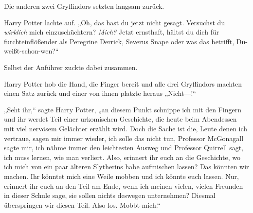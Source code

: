 Die anderen zwei Gryffindors setzten langsam zurück.

Harry Potter lachte auf. „Oh, das hast du jetzt nicht gesagt. Versuchst du \emph{wirklich} mich einzuschüchtern? \emph{Mich?} Jetzt ernsthaft, hältst du dich für furchteinflößender als Peregrine Derrick, Severus Snape oder was das betrifft, Du-weißt-schon-wen?“

Selbst der Anführer zuckte dabei zusammen.

Harry Potter hob die Hand, die Finger bereit und alle drei Gryffindors machten einen Satz zurück und einer von ihnen platzte heraus „Nicht—!“

„Seht ihr,“ sagte Harry Potter, „an diesem Punkt schnippe ich mit den Fingern und ihr werdet Teil einer urkomischen Geschichte, die heute beim Abendessen mit viel nervösem Gelächter erzählt wird. Doch die Sache ist die, Leute denen ich vertraue, sagen mir immer wieder, ich solle das nicht tun, Professor McGonagall sagte mir, ich nähme immer den leichtesten Ausweg und Professor Quirrell sagt, ich muss lernen, wie man verliert. Also, erinnert ihr euch an die Geschichte, wo ich mich von ein paar älteren Slytherins habe aufmischen lassen? Das könnten wir machen. Ihr könntet mich eine Weile mobben und ich könnte euch lassen. Nur, erinnert ihr euch an den Teil am Ende, wenn ich meinen vielen, vielen Freunden in dieser Schule sage, sie sollen nichts deswegen unternehmen? Diesmal überspringen wir diesen Teil. Also los. Mobbt mich.“

